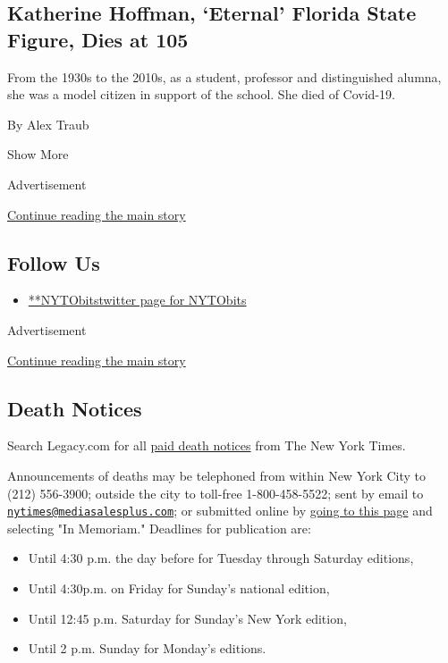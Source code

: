 \begin{enumerate}
  \hypertarget{katherine-hoffman-eternal-florida-state-figure-dies-at-105}{%
  \subsection{Katherine Hoffman, `Eternal' Florida State Figure, Dies at
  105}\label{katherine-hoffman-eternal-florida-state-figure-dies-at-105}}

  From the 1930s to the 2010s, as a student, professor and distinguished
  alumna, she was a model citizen in support of the school. She died of
  Covid-19.

  By Alex Traub
\end{enumerate}

Show More

Advertisement

\protect\hyperlink{after-mid3}{Continue reading the main story}

\hypertarget{follow-us}{%
\subsection{Follow Us}\label{follow-us}}

\begin{itemize}
\tightlist
\item
  \href{https://twitter.com/NYTObits}{**NYTObitstwitter page for
  NYTObits}
\end{itemize}

Advertisement

\protect\hyperlink{after-mktg}{Continue reading the main story}

\hypertarget{death-notices}{%
\subsection{Death Notices}\label{death-notices}}

Search Legacy.com for all \href{https://www.legacy.com/NYTimes/}{paid
death notices} from The New York Times.

Announcements of deaths may be telephoned from within New York City to
(212) 556-3900; outside the city to toll-free 1-800-458-5522; sent by
email to
\href{mailto:nytimes@mediasalesplus.com}{\nolinkurl{nytimes@mediasalesplus.com}};
or submitted online by
\href{https://advertising.nytimes.com/irj/go/nyt/prtroot/fwk/classified}{going
to this page} and selecting "In Memoriam." Deadlines for publication
are:

\begin{itemize}
\tightlist
\item
  Until 4:30 p.m. the day before for Tuesday through Saturday editions,
\item
  Until 4:30p.m. on Friday for Sunday's national edition,
\item
  Until 12:45 p.m. Saturday for Sunday's New York edition,
\item
  Until 2 p.m. Sunday for Monday's editions.
\end{itemize}

